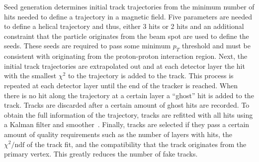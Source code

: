 Seed generation determines initial track trajectories from the minimum number of hits needed to define a trajectory in a magnetic field. Five parameters are needed to define a helical trajectory and thus, either 3 hits or 2 hits and an additional constraint that the particle originates from the beam spot are used to define the seeds. These seeds are required to pass some minimum $p_{T}$ threshold and must be consistent with originating from the proton-proton interaction region. Next, the initial track trajectories are extrapolated out and at each detector layer the hit with the smallest $\chi^{2}$ to the trajectory is added to the track. This process is repeated at each detector layer until the end of the tracker is reached. When there is no hit along the trajectory at a certain layer a ``ghost'' hit is added to the track. Tracks are discarded after a certain amount of ghost hits are recorded. To obtain the full information of the trajectory, tracks are refitted with all hits using a Kalman filter and smoother~\cite{KalmanFilter}. Finally, tracks are selected if they pass a certain amount of quality requirements such as the number of layers with hits, the $\chi^{2}/\mathrm{ndf}$ of the track fit, and the compatibility that the track originates from the primary vertex. This greatly reduces the number of fake tracks. 




